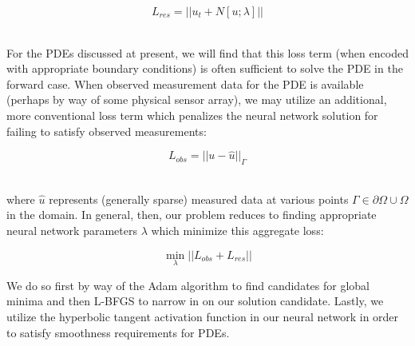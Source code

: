 \documentclass[letterpaper,12pt]{article}
\begin{document}
    $$
    L_{res} = ||u_t + N[u; \lambda]||
    $$

    \ \\
    For the PDEs discussed at present, we will find that this loss term (when encoded with appropriate boundary 
    conditions) is often sufficient to solve the PDE in the forward case. When observed measurement data for the PDE 
    is available (perhaps by way of some physical sensor array), we may utilize an additional, more conventional loss 
    term which penalizes the neural network solution for failing to satisfy observed measurements:

    $$
    L_{obs} = ||u - \hat{u}||_{\Gamma}
    $$

    \ \\
    \noindent where $\hat{u}$ represents (generally sparse) measured data at various points 
    $\Gamma \in \partial \Omega \cup \Omega$ in the domain. In general, then, our problem reduces to finding appropriate
    neural network parameters $\lambda$ which minimize this aggregate loss:
    
    $$
    \min_{\lambda}{||L_{obs} + L_{res}||}
    $$

    We do so first by way of the Adam\cite{adam} algorithm to find candidates for global minima and then L-BFGS to 
    narrow in on our solution candidate. Lastly, we utilize the hyperbolic tangent activation function in our neural 
    network in order to satisfy smoothness requirements for PDEs.


\end{document}
